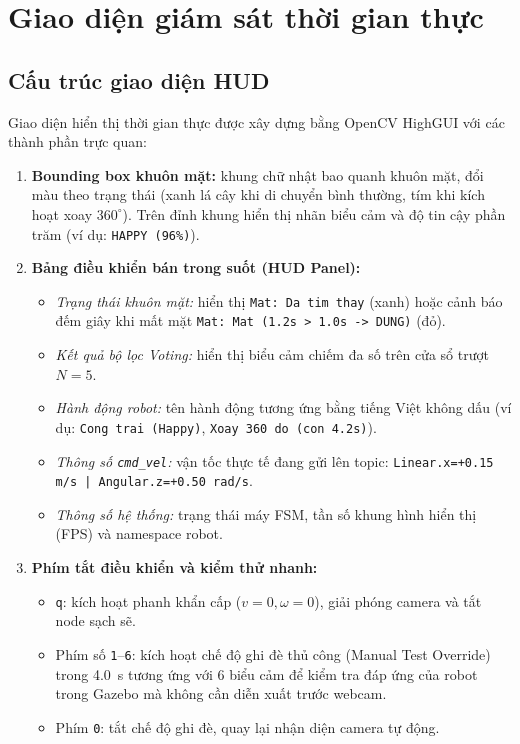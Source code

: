 \section{Giao diện giám sát thời gian thực}

\subsection{Cấu trúc giao diện HUD}
Giao diện hiển thị thời gian thực được xây dựng bằng OpenCV HighGUI với các thành phần trực quan:
\begin{enumerate}
    \item \textbf{Bounding box khuôn mặt:} khung chữ nhật bao quanh khuôn mặt, đổi màu theo trạng thái (xanh lá cây khi di chuyển bình thường, tím khi kích hoạt xoay $360^\circ$). Trên đỉnh khung hiển thị nhãn biểu cảm và độ tin cậy phần trăm (ví dụ: \texttt{HAPPY (96\%)}).
    \item \textbf{Bảng điều khiển bán trong suốt (HUD Panel):}
    \begin{itemize}
        \item \textit{Trạng thái khuôn mặt:} hiển thị \texttt{Mat: Da tim thay} (xanh) hoặc cảnh báo đếm giây khi mất mặt \texttt{Mat: Mat (1.2s > 1.0s -> DUNG)} (đỏ).
        \item \textit{Kết quả bộ lọc Voting:} hiển thị biểu cảm chiếm đa số trên cửa sổ trượt $N=5$.
        \item \textit{Hành động robot:} tên hành động tương ứng bằng tiếng Việt không dấu (ví dụ: \texttt{Cong trai (Happy)}, \texttt{Xoay 360 do (con 4.2s)}).
        \item \textit{Thông số \texttt{cmd\_vel}:} vận tốc thực tế đang gửi lên topic: \texttt{Linear.x=+0.15 m/s | Angular.z=+0.50 rad/s}.
        \item \textit{Thông số hệ thống:} trạng thái máy FSM, tần số khung hình hiển thị (FPS) và namespace robot.
    \end{itemize}
    \item \textbf{Phím tắt điều khiển và kiểm thử nhanh:}
    \begin{itemize}
        \item \texttt{q}: kích hoạt phanh khẩn cấp ($v=0, \omega=0$), giải phóng camera và tắt node sạch sẽ.
        \item Phím số \texttt{1}--\texttt{6}: kích hoạt chế độ ghi đè thủ công (Manual Test Override) trong \SI{4.0}{\second} tương ứng với 6 biểu cảm để kiểm tra đáp ứng của robot trong Gazebo mà không cần diễn xuất trước webcam.
        \item Phím \texttt{0}: tắt chế độ ghi đè, quay lại nhận diện camera tự động.
    \end{itemize}
\end{enumerate}

